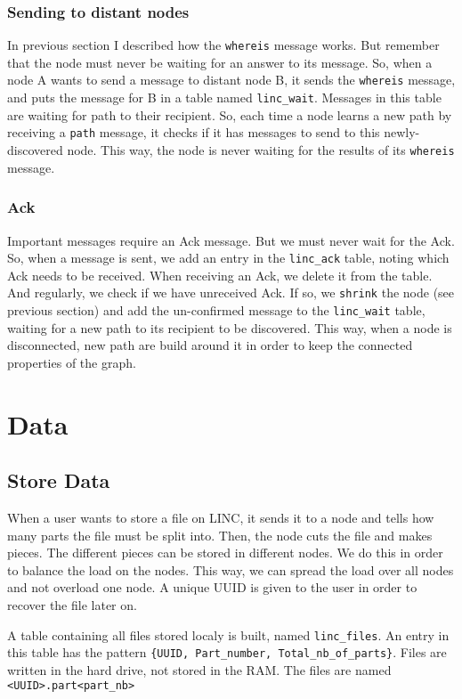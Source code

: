 \documentclass[a4paper,10pt]{report}
\begin{document}
\subsection{Sending to distant nodes}
In previous section I described how the \texttt{whereis} message works.
But remember that the node must never be waiting for an answer to its
message. So, when a node A wants to send a message to distant node B, 
it sends the \texttt{whereis} message, and puts the message for B in a 
table named \texttt{linc\_wait}. Messages in this table are waiting for 
path to their recipient. So, each time a node learns a new path by 
receiving a \texttt{path} message, it checks if it has messages to send
to this newly-discovered node. This way, the node is never waiting for
the results of its \texttt{whereis} message.

\subsection{Ack}
Important messages require an Ack message. But we must never wait for 
the Ack. So, when a message is sent, we add an entry in the
\texttt{linc\_ack} table, noting which Ack needs to be received. 
When receiving an Ack, we delete it from the table. And regularly, we 
check if we have unreceived Ack. If so, we \texttt{shrink} the node 
(see previous section) and add the un-confirmed message to the 
\texttt{linc\_wait} table, waiting for a new path to its recipient to 
be discovered. This way, when a node is disconnected, new path are build
around it in order to keep the connected properties of the graph.

\chapter{Data}
\section{Store Data}
When a user wants to store a file on LINC, it sends it to a node and
tells how many parts the file must be split into. Then, the node
cuts the file and makes pieces. The different pieces can be stored 
in different nodes. We do this in order to balance the load on the
nodes. This way, we can spread the load over all nodes and not overload
one node. A unique UUID is given to the user in order to recover the
file later on.

A table containing all files stored localy is built, named 
\texttt{linc\_files}. An entry in this table has the pattern 
\texttt{\{UUID, Part\_number, Total\_nb\_of\_parts\}}.
Files are written in the hard drive, not stored in the RAM. The files
are named \texttt{<UUID>.part<part\_nb>}
\end{document}
